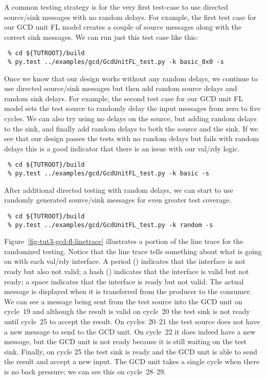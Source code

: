\documentclass{cbxdoc}
\begin{document}
A common testing strategy is for the very first test-case to use directed
source/sink messages with no random delays. For example, the first test
case for our GCD unit FL model creates a couple of source messages along
with the correct sink messages. We can run just this test case like this:

\begin{verbatim}
 % cd ${TUTROOT}/build
 % py.test ../examples/gcd/GcdUnitFL_test.py -k basic_0x0 -s
\end{verbatim}

Once we know that our design works without any random delays, we continue
to use directed source/sink messages but then add random source delays
and random sink delays. For example, the second test case for our GCD
unit FL model sets the test source to randomly delay the input messages
from zero to five cycles. We can also try using no delays on the source,
but adding random delays to the sink, and finally add random delays to
both the source and the sink. If we see that our design passes the tests
with no random delays but fails with random delays this is a good
indicator that there is an issue with our val/rdy logic.

\begin{verbatim}
 % cd ${TUTROOT}/build
 % py.test ../examples/gcd/GcdUnitFL_test.py -k basic -s
\end{verbatim}

After additional directed testing with random delays, we can start to use
randomly generated source/sink messages for even greater test coverage.

\begin{verbatim}
 % cd ${TUTROOT}/build
 % py.test ../examples/gcd/GcdUnitFL_test.py -k random -s
\end{verbatim}



Figure~\ref{fig-tut3-gcd-fl-linetrace} illustrates a portion of the line
trace for the randomized testing. Notice that the line trace tells
something about what is going on with each val/rdy interface. A period
() indicates that the interface is not ready but also not valid; a
hash (\TT{\#}) indicates that the interface is valid but not ready; a
space indicates that the interface is ready but not valid. The actual
message is displayed when it is transferred from the producer to the
consumer. We can see a message being sent from the test source into the
GCD unit on cycle~19 and although the result is valid on cycle~20 the
test sink is not ready until cycle~25 to accept the result. On
cycles~20--21 the test source does not have a new message to send to the
GCD unit. On cycle~22 it does indeed have a new message, but the GCD unit
is not ready because it is still waiting on the test sink. Finally, on
cycle 25 the test sink is ready and the GCD unit is able to send the
result and accept a new input. The GCD unit takes a single cycle when
there is no back pressure; we can see this on cycle~28--29.
\end{document}

